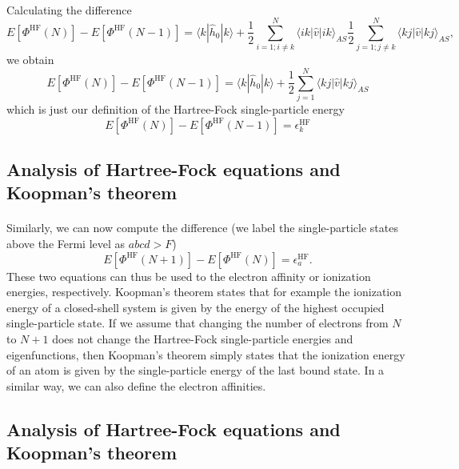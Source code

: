\documentclass[%
twoside,                 %
final,                   %
10pt]{article}
\begin{document}
\paragraph{}
Calculating the difference 
\[
  E[\Phi^{\mathrm{HF}}(N)]-   E[\Phi^{\mathrm{HF}}(N-1)] = \langle k | \hat{h}_0 | k \rangle +
  \frac{1}{2}\sum_{i=1;i\ne k}^N\langle ik|\hat{v}|ik\rangle_{AS}  \frac{1}{2}\sum_{j=1;j\ne k}^N\langle kj|\hat{v}|kj\rangle_{AS},
\]
we obtain
\[
  E[\Phi^{\mathrm{HF}}(N)]-   E[\Phi^{\mathrm{HF}}(N-1)] = \langle k | \hat{h}_0 | k \rangle +
  \frac{1}{2}\sum_{j=1}^N\langle kj|\hat{v}|kj\rangle_{AS}
\]
which is just our definition of the Hartree-Fock single-particle energy
\[
  E[\Phi^{\mathrm{HF}}(N)]-   E[\Phi^{\mathrm{HF}}(N-1)] = \epsilon_k^{\mathrm{HF}} 
\]



\subsection{Analysis of Hartree-Fock equations and Koopman's theorem}

\paragraph{}
Similarly, we can now compute the difference (we label the single-particle states above the Fermi level as $abcd > F$)
\[
  E[\Phi^{\mathrm{HF}}(N+1)]-   E[\Phi^{\mathrm{HF}}(N)]= \epsilon_a^{\mathrm{HF}}. 
\]
These two equations can thus be used to the electron affinity or ionization energies, respectively. 
Koopman's theorem states that for example the ionization energy of a closed-shell system is given by the energy of the highest occupied single-particle state.  If we assume that changing the number of electrons from $N$ to $N+1$ does not change the Hartree-Fock single-particle energies and eigenfunctions, then Koopman's theorem simply states that the ionization energy of an atom is given by the single-particle energy of the last bound state. In a similar way, we can also define the electron affinities.



\subsection{Analysis of Hartree-Fock equations and Koopman's theorem}
\end{document}
